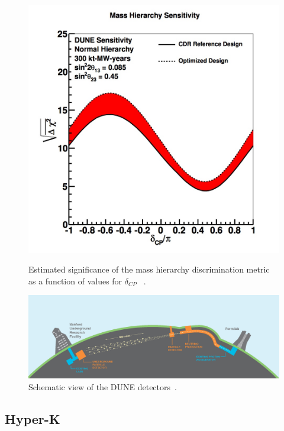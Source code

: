 \begin{figure}[h!]
  \centering
  \begin{minipage}[b]{0.49\textwidth}
    \includegraphics[width=\textwidth]{figures/dune2.jpeg}
    \vspace{2mm}
    \caption{Estimated significance of the mass hierarchy discrimination metric as a function of values for $\delta_{CP}$ ~\cite{23DUNE}.}
    \label{fig:dune1}
  \end{minipage}
  \hfill
  \begin{minipage}[b]{0.49\textwidth}
    \includegraphics[width=\textwidth]{figures/dune.png}
       \vspace{2mm}
    \caption{Schematic view of the DUNE detectors~\cite{23DUNE}.}
     \label{fig:dune2}
  \end{minipage}
\end{figure}

\subsection{Hyper-K}

